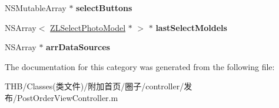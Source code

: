 \begin{DoxyCompactItemize}
N\+S\+Mutable\+Array $\ast$ {\bfseries select\+Buttons}
\item 
\mbox{\label{category_post_order_view_controller_07_08_a01236aa833668a9e64f0851f23a2e5bf}} 
N\+S\+Array$<$ \mbox{\hyperlink{interface_z_l_select_photo_model}{Z\+L\+Select\+Photo\+Model}} $\ast$ $>$ $\ast$ {\bfseries last\+Select\+Moldels}
\item 
\mbox{\label{category_post_order_view_controller_07_08_aad7b2f04000e5e31ee054e23bbad8658}} 
N\+S\+Array $\ast$ {\bfseries arr\+Data\+Sources}
\end{DoxyCompactItemize}


The documentation for this category was generated from the following file\+:\begin{DoxyCompactItemize}
\item 
T\+H\+B/\+Classes(类文件)/附加首页/圈子/controller/发布/Post\+Order\+View\+Controller.\+m\end{DoxyCompactItemize}
